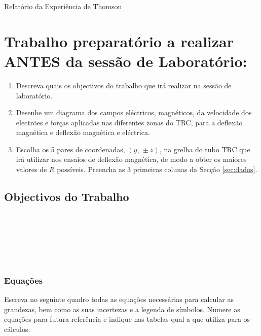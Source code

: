 \documentclass[a4paper,12pt]{article}  %
\author{Prof. Bernardo B. Carvalho}
\date{ Outubro 2015}
\begin{document}
 
{  \sf  Relatório da Experiência de Thomson} %




\section{\sf Trabalho preparatório a realizar ANTES da sessão de Laboratório:}
\begin{enumerate}
\item Descreva quais os objectivos do trabalho que irá realizar na sessão de laboratório. 
\item Desenhe um diagrama dos campos eléctricos, magnéticos, da velocidade dos electrões e forças aplicadas nas diferentes zonas do TRC, para a deflexão magnética e deflexão magnética e eléctrica.
\item Escolha os 5 pares de coordenadas, $(y,\, \pm z)$, na grelha do tubo TRC que irá utilizar nos ensaios de deflexão magnética, de modo a obter os maiores valores  de $R$ possíveis. Preencha as 3 primeiras colunas da Secção \ref{sec:dados}.
\end{enumerate}

\subsection{\sf Objectivos do Trabalho}
\noindent\underline{\makebox[\textwidth][r]{~}} \\
\noindent\underline{\makebox[\textwidth][r]{~}} \\
\noindent\underline{\makebox[\textwidth][r]{~}} \\
\noindent\underline{\makebox[\textwidth][r]{~}} \\
\noindent\underline{\makebox[\textwidth][r]{~}} \\

\subsubsection{\sf Equações }
Escreva no seguinte quadro todas as equações necessárias para calcular as grandezas, bem como as suas incertezas e a legenda de símbolos.  Numere as equações para futura referência  e indique nas tabelas qual a que utiliza para os cálculos.

\framebox[18cm]{\rule{0pt}{7cm}}
\end{document}
